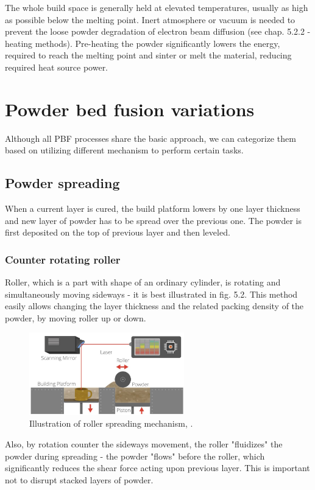 \documentclass[a4paper, 11pt, reqno]{report}
\begin{document}
	The whole build space is generally held at elevated temperatures, usually as high as possible below the melting point. Inert atmosphere or vacuum is needed to prevent the loose powder degradation of electron beam diffusion (see chap. 5.2.2 - heating methods). Pre-heating the powder significantly lowers the energy, required to reach the melting point and sinter or melt the material, reducing required heat source power.
	
\section{Powder bed fusion variations}
Although all PBF processes share the basic approach, we can categorize them based on utilizing different mechanism to perform certain tasks.

\subsection{Powder spreading}
When a current layer is cured, the build platform lowers by one layer thickness and new layer of powder has to be spread over the previous one. The powder is first deposited on the top of previous layer and then leveled.

\subsubsection{Counter rotating roller}
Roller, which is a part with shape of an ordinary cylinder, is rotating and simultaneously moving sideways - it is best illustrated in fig. 5.2. This method easily allows changing the layer thickness and the related packing density of the powder, by moving roller up or down.
\begin{figure}[b]
	\centering
 	\includegraphics[width=0.6\textwidth]{roller}
	\caption{Illustration of roller spreading mechanism, \cite{chinese}.}
\end{figure}

Also, by rotation counter the sideways movement, the roller "fluidizes" the powder during spreading - the powder "flows" before the roller, which significantly reduces the shear force acting upon previous layer. This is important not to disrupt stacked layers of powder.
\end{document}
